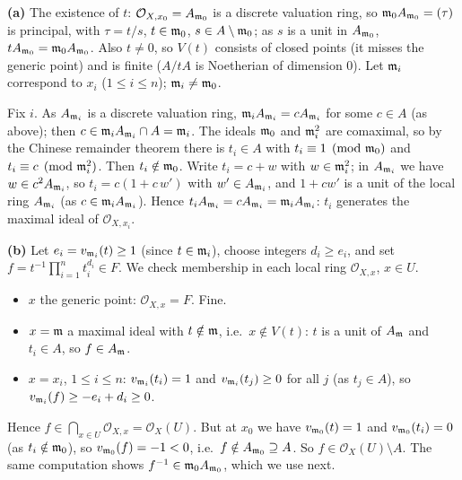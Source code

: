 \documentclass[11pt]{article}
\begin{document}
\textbf{(a)} The existence of $t$: $\mathcal O_{X,x_0}=A_{\mathfrak m_0}$ is a discrete valuation ring, so $\mathfrak m_0A_{\mathfrak m_0}=(\tau)$ is principal, with $\tau=t/s$, $t\in\mathfrak m_0$, $s\in A\setminus\mathfrak m_0$; as $s$ is a unit in $A_{\mathfrak m_0}$, $tA_{\mathfrak m_0}=\mathfrak m_0A_{\mathfrak m_0}$. Also $t\neq0$, so $V(t)$ consists of closed points (it misses the generic point) and is finite ($A/tA$ is Noetherian of dimension $0$). Let $\mathfrak m_i$ correspond to $x_i$ ($1\le i\le n$); $\mathfrak m_i\neq\mathfrak m_0$.

Fix $i$. As $A_{\mathfrak m_i}$ is a discrete valuation ring, $\mathfrak m_iA_{\mathfrak m_i}=cA_{\mathfrak m_i}$ for some $c\in A$ (as above); then $c\in\mathfrak m_iA_{\mathfrak m_i}\cap A=\mathfrak m_i$. The ideals $\mathfrak m_0$ and $\mathfrak m_i^2$ are comaximal, so by the Chinese remainder theorem there is $t_i\in A$ with $t_i\equiv1\pmod{\mathfrak m_0}$ and $t_i\equiv c\pmod{\mathfrak m_i^2}$. Then $t_i\notin\mathfrak m_0$. Write $t_i=c+w$ with $w\in\mathfrak m_i^2$; in $A_{\mathfrak m_i}$ we have $w\in c^2A_{\mathfrak m_i}$, so $t_i=c(1+c\,w')$ with $w'\in A_{\mathfrak m_i}$, and $1+cw'$ is a unit of the local ring $A_{\mathfrak m_i}$ (as $c\in\mathfrak m_iA_{\mathfrak m_i}$). Hence $t_iA_{\mathfrak m_i}=cA_{\mathfrak m_i}=\mathfrak m_iA_{\mathfrak m_i}$: $t_i$ generates the maximal ideal of $\mathcal O_{X,x_i}$.

\textbf{(b)} Let $e_i=v_{\mathfrak m_i}(t)\ge1$ (since $t\in\mathfrak m_i$), choose integers $d_i\ge e_i$, and set $f=t^{-1}\prod_{i=1}^nt_i^{d_i}\in F$. We check membership in each local ring $\mathcal O_{X,x}$, $x\in U$.
\begin{itemize}
\item $x$ the generic point: $\mathcal O_{X,x}=F$. Fine.
\item $x=\mathfrak m$ a maximal ideal with $t\notin\mathfrak m$, i.e.\ $x\notin V(t)$: $t$ is a unit of $A_\mathfrak m$ and $t_i\in A$, so $f\in A_\mathfrak m$.
\item $x=x_i$, $1\le i\le n$: $v_{\mathfrak m_i}(t_i)=1$ and $v_{\mathfrak m_i}(t_j)\ge0$ for all $j$ (as $t_j\in A$), so $v_{\mathfrak m_i}(f)\ge-e_i+d_i\ge0$.
\end{itemize}
Hence $f\in\bigcap_{x\in U}\mathcal O_{X,x}=\mathcal O_X(U)$. But at $x_0$ we have $v_{\mathfrak m_0}(t)=1$ and $v_{\mathfrak m_0}(t_i)=0$ (as $t_i\notin\mathfrak m_0$), so $v_{\mathfrak m_0}(f)=-1<0$, i.e.\ $f\notin A_{\mathfrak m_0}\supseteq A$. So $f\in\mathcal O_X(U)\setminus A$. The same computation shows $f^{-1}\in\mathfrak m_0A_{\mathfrak m_0}$, which we use next.
\end{document}
